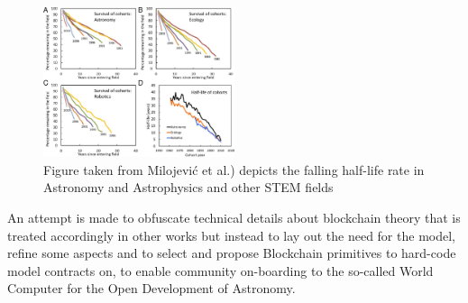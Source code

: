 \documentclass[final,5p,times,twocolumn,authoryear]{elsarticle}
\begin{document}
\begin{figure}[h!]
    \centering
    \label{fig:F4.large}
  \caption{Figure taken from Milojević et al.) depicts the falling half-life rate in Astronomy and Astrophysics and other STEM fields}
  \includegraphics[width=0.5\textwidth]{figs/F4.large.jpg}
\end{figure}

An attempt is made to obfuscate technical details about blockchain theory that is treated accordingly in other works but instead to lay out the need for the model, refine some aspects and to select and propose Blockchain primitives to hard-code model contracts on, to enable community on-boarding to the so-called World Computer for the Open Development of Astronomy.
\end{document}

